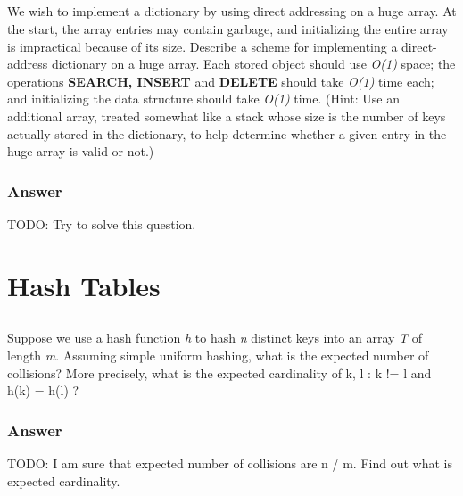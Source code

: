     \subsection {}

    We wish to implement a dictionary by using direct addressing on a huge
    array. At the start, the array entries may contain garbage, and
    initializing the entire array is impractical because of its size. Describe
    a scheme for implementing a direct-address dictionary on a huge array. Each
    stored object should use \textit{O(1)} space; the operations
    \textbf{SEARCH, INSERT} and \textbf{DELETE} should take \textit{O(1)} time
    each; and initializing the data structure should take \textit{O(1)} time.
    (Hint: Use an additional array, treated somewhat like a stack whose size is
    the number of keys actually stored in the dictionary, to help determine
    whether a given entry in the huge array is valid or not.)

      \subsubsection {Answer}
      TODO: Try to solve this question.

  \section{Hash Tables}

    \subsection{}

    Suppose we use a hash function \textit{h} to hash \textit{n} distinct keys
    into an array \textit{T} of length \textit{m}. Assuming simple uniform
    hashing, what is the expected number of collisions? More precisely, what is
    the expected cardinality of {{k, l} : k != l and h(k) = h(l)} ?

    \subsubsection{Answer}

    TODO: I am sure that expected number of collisions are n / m. Find out what
    is expected cardinality.

    \subsection{}

